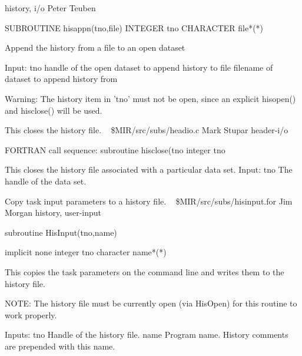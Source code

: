 \newline {} history, i/o
\newline {} Peter Teuben
\par{\tenpoint
{\eightpoint\begintt
      SUBROUTINE hisappn(tno,file)
      INTEGER   tno
      CHARACTER file*(*)

   Append the history from a file to an open dataset

   Input:
       tno        handle of the open dataset to append history to
       file       filename of dataset to append history from

   Warning: The history item in 'tno' must not be open, since an
       explicit hisopen() and hisclose() will be used.
\endtt}
\par}
%
\noindent This closes the history file.
\newline \ 
\newline {} \$MIR/src/subs/headio.c
\newline {} Mark Stupar
\newline {} header-i/o
\par{\tenpoint
{\eightpoint\begintt
FORTRAN call sequence:
        subroutine hisclose(tno
        integer tno

  This closes the history file associated with a particular data set.
  Input:
    tno         The handle of the data set.                             
\endtt}
\par}
%
\noindent Copy task input parameters to a history file.
\newline \ 
\newline {} \$MIR/src/subs/hisinput.for
\newline {} Jim Morgan
\newline \abox{Keywords:} history, user-input
\par{\tenpoint
{\eightpoint\begintt
        subroutine HisInput(tno,name)

        implicit none
        integer tno
        character name*(*)

  This copies the task parameters on the command line and writes them
  to the history file.

  NOTE:  The history file must be currently open (via HisOpen) for 
  this routine to work properly.

  Inputs:
    tno        Handle of the history file.
    name       Program name. History comments are prepended with this
               name.
\endtt}
\par}
